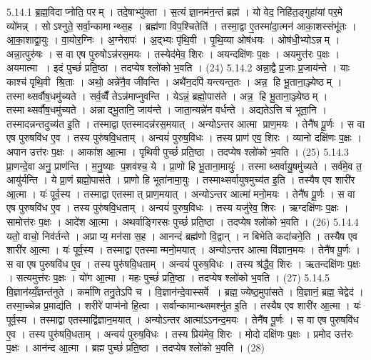 5.14.1
ब्र॒ह्म॒विदाप्नोति॒ परम् । तदे॒षाभ्यु॑क्ता । स॒त्यं ज्ञा॒नम॑न॒न्तं ब्रह्म॑ । यो वेद॒ निहि॑त॒ङ्गुहा॑यां पर॒मे व्यो॑मन्न् । सोऽश्नुते॒ सर्वा॒न्कामान्थ्स॒ह । ब्रह्म॑णा विप॒श्चितेति॑ । तस्मा॒द्वा ए॒तस्मा॑दा॒त्मन॑ आका॒शस्संभू॑तः । आ॒का॒शाद्वा॒युः । वा॒योर॒ग्निः । अ॒ग्नेरापः॑ । अ॒द्भ्यः पृ॑थि॒वी । पृ॒थि॒व्या ओष॑धयः । ओष॑धी॒भ्योऽन्नम् । अन्ना॒त्पुरु॑षः । स वा एष पुरुषोऽन्न॑रस॒मयः । तस्येद॑मेव॒ शिरः । अयन्दक्षि॑णः प॒क्षः । अयमुत्त॑रः प॒क्षः । अयमात्मा । इदं पुच्छं॑ प्रति॒ष्ठा । तदप्येष श्लो॑को भ॒वति । (24)
5.14.2
अन्ना॒द्वै प्र॒जाः प्र॒जाय॑न्ते । याः काश्च॑ पृथि॒वी श्रि॒ताः । अथो॒ अन्ने॑नै॒व जी॑वन्ति । अथै॑न॒दपि॑ यन्त्यन्त॒तः । अन्न॒॒ हि भू॒ताना॒ञ्ज्येष्ठम् । तस्माथ्सर्वौष॒धमु॑च्यते । सर्व॒व्वैँ तेऽन्न॑माप्नुवन्ति । येऽन्नं॒ ब्रह्मो॒पास॑ते । अन्न॒॒ हि भू॒ताना॒ञ्ज्येष्ठम् । तस्माथ्सर्वौष॒धमु॑च्यते । अन्नाद्भू॒तानि॒ जाय॑न्ते । जाता॒न्यन्ने॑न वर्धन्ते । अद्यतेऽत्ति च॑ भूता॒नि । तस्मादन्नन्तदुच्य॑त इ॒ति । तस्माद्वा एतस्मादन्न॑रस॒मयात् । अन्योऽन्तर आत्मा प्राण॒मयः । तेनै॑ष पू॒र्णः । स वा एष पुरुषवि॑ध ए॒व । तस्य पुरु॑षवि॒धताम् । अन्वयं॑ पुरुष॒विधः । तस्य प्राण॑ एव॒ शिरः । व्यानो दक्षि॑णः प॒क्षः । अपान उत्त॑रः प॒क्षः । आका॑श आ॒त्मा । पृथिवी पुच्छं॑ प्रति॒ष्ठा । तदप्येष श्लो॑को भ॒वति । (25)
5.14.3
प्रा॒णन्दे॒वा अनु॒ प्राण॑न्ति । म॒नु॒ष्याः प॒शव॑श्च॒ ये । प्रा॒णो हि भू॒ताना॒मायुः॑ । तस्माथ्सर्वायु॒षमु॑च्यते । सर्व॑मे॒व त॒ आयु॑र्यन्ति । ये प्रा॒णं ब्रह्मो॒पास॑ते । प्राणो हि भूता॑नामा॒युः । तस्माथ्सर्वायुषमुच्य॑त इ॒ति । तस्यैष एव शारी॑र आ॒त्मा । यः॑ पूर्व॒स्य । तस्माद्वा एतस्मात् प्राण॒मयात् । अन्योऽन्तर आत्मा॑ मनो॒मयः । तेनै॑ष पू॒र्णः । स वा एष पुरुषवि॑ध ए॒व । तस्य पुरु॑षवि॒धताम् । अन्वयं॑ पुरुष॒विधः । तस्य यजु॑रेव॒ शिरः । ऋग्दक्षि॑णः प॒क्षः । सामोत्त॑रः प॒क्षः । आदे॑श आ॒त्मा । अथर्वाङ्गिरसः पुच्छं॑ प्रति॒ष्ठा । तदप्येष श्लो॑को भ॒वति । (26)
5.14.4
यतो॒ वाचो॒ निव॑र्तन्ते । अप्राप्य॒ मन॑सा स॒ह । आनन्दं ब्रह्म॑णो वि॒द्वान् । न बिभेति कदा॑चने॒ति । तस्यैष एव शारी॑र आ॒त्मा । यः॑ पूर्व॒स्य । तस्माद्वा एतस्मान्मनो॒मयात् । अन्योऽन्तर आत्मा वि॑ज्ञान॒मयः । तेनै॑ष पू॒र्णः । स वा एष पुरुषवि॑ध ए॒व । तस्य पुरु॑षवि॒धताम् । अन्वयं॑ पुरुष॒विधः । तस्य श्र॑द्धैव॒ शिरः । ऋतन्दक्षि॑णः प॒क्षः । सत्यमुत्त॑रः प॒क्षः । यो॑ग आ॒त्मा । महः पुच्छं॑ प्रति॒ष्ठा । तदप्येष श्लो॑को भ॒वति । (27)
5.14.5
वि॒ज्ञान॑य्यँ॒ज्ञन्त॑नुते । कर्मा॑णि तनु॒तेऽपि॑ च । वि॒ज्ञान॑न्दे॒वास्सर्वे । ब्रह्म॒ ज्येष्ठ॒मुपा॑सते । वि॒ज्ञानं॒ ब्रह्म॒ चेद्वेद॑ । तस्मा॒च्चेन्न प्र॒माद्य॑ति । शरीरे॑ पाप्म॑नो हि॒त्वा । सर्वान्कामान्थ्समश्नु॑त इ॒ति । तस्यैष एव शारी॑र आ॒त्मा । यः॑ पूर्व॒स्य । तस्माद्वा एतस्माद्वि॑ज्ञान॒मयात् । अन्योऽन्तर आत्मा॑ऽऽनन्द॒मयः । तेनै॑ष पू॒र्णः । स वा एष पुरुषवि॑ध ए॒व । तस्य पुरु॑षवि॒धताम् । अन्वयं॑ पुरुष॒विधः । तस्य प्रिय॑मेव॒ शिरः । मोदो दक्षि॑णः प॒क्षः । प्रमोद उत्त॑रः प॒क्षः । आन॑न्द आ॒त्मा । ब्रह्म पुच्छं॑ प्रति॒ष्ठा । तदप्येष श्लो॑को भ॒वति । (28)
